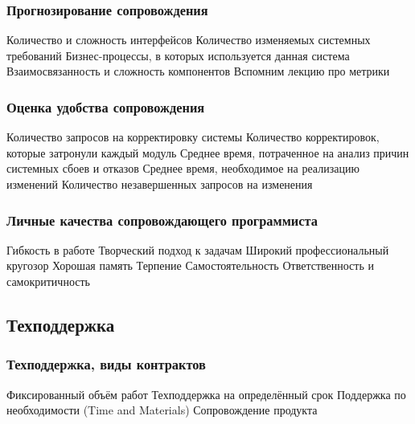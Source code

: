 \documentclass{../../slides-style}
\begin{document}
    \begin{frame}
        \frametitle{Прогнозирование сопровождения}
        \begin{outline}
            \1 Количество и сложность интерфейсов
            \1 Количество изменяемых системных требований
            \1 Бизнес-процессы, в которых используется данная система
            \1 Взаимосвязанность и сложность компонентов
                \2 Вспомним лекцию про метрики
        \end{outline}
    \end{frame}

    \begin{frame}
        \frametitle{Оценка удобства сопровождения}
        \begin{outline}
            \1 Количество запросов на корректировку системы
            \1 Количество корректировок, которые затронули каждый модуль
            \1 Среднее время, потраченное на анализ причин системных сбоев и отказов
            \1 Среднее время, необходимое на реализацию изменений
            \1 Количество незавершенных запросов на изменения
        \end{outline}
    \end{frame}

    \begin{frame}
        \frametitle{Личные качества сопровождающего программиста}
        \begin{outline}
            \1 Гибкость в работе
            \1 Творческий подход к задачам
            \1 Широкий профессиональный кругозор
            \1 Хорошая память
            \1 Терпение
            \1 Самостоятельность
            \1 Ответственность и самокритичность
        \end{outline}
    \end{frame}

    \subsection{Техподдержка}

    \begin{frame}
        \frametitle{Техподдержка, виды контрактов}
        \begin{outline}
            \1 Фиксированный объём работ
            \1 Техподдержка на определённый срок
            \1 Поддержка по необходимости (Time and Materials)
            \1 Сопровождение продукта
        \end{outline}
    \end{frame}
\end{document}
